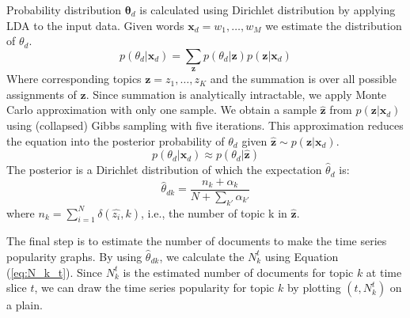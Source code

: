 \documentclass[a4paper]{report}
\begin{document}
Probability distribution $\mathbf{\theta}_d$ is calculated using Dirichlet distribution by applying LDA to the input data. Given words $ \mathbf{x}_d = w_1, \dots , w_M$ we estimate the distribution of $\theta_d$.
\begin{equation}
p(\theta_d|\mathbf{x}_d) = \sum_\mathbf{z} p(\theta_d|\mathbf{z})p(\mathbf{z}|\mathbf{x}_d)
\end{equation}
Where corresponding topics $\mathbf{z} = z_1, \dots, z_K$ and the summation is over all possible assignments of $\mathbf{z}$. Since summation is analytically intractable, we apply Monte Carlo approximation with only one sample. We obtain a sample $ \hat{\mathbf{z}} $ from $ p(\mathbf{z}|\mathbf{x}_d) $ using (collapsed) Gibbs sampling with five iterations. This approximation reduces the equation into the posterior probability of $ \theta_d $ given $ \hat{\mathbf{z}} \sim p(\mathbf{z}|\mathbf{x}_d) $.
\begin{equation}
p(\theta_d|\mathbf{x}_d) \approx p(\theta_d|\hat{\mathbf{z}})
\end{equation}
The posterior is a Dirichlet distribution of which the expectation $\hat{\theta}_d$ is:
\begin{equation}
\hat{\theta}_{dk} = \frac{n_k + \alpha_k}{N + \sum_{k'} \alpha_{k'}}
\end{equation}
where $ n_k = \sum_{i=1}^N \delta(\hat{z_i}, k) $, i.e., the number of topic k in $\hat{\mathbf{z}}$.

The final step is to estimate the number of documents to make the time series popularity graphs. By using $\hat{\theta}_{dk}$, we calculate the $N_k^t$ using Equation (\ref{eq:N_k_t}). Since $N_k^t$ is the estimated number of documents for topic $k$ at time slice $t$, we can draw the time series popularity for topic $k$ by plotting $(t, N_k^t)$ on a plain.

\end{document}
